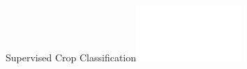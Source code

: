 



{
	\begin{frame}[plain]
	
	\Huge\color{white}
			\vspace{7em}
			\hfill Supervised Crop Classification\includegraphics[width=4cm]{images/TUM-white}\hspace{3em}
		
			
%			
			
	
	\vfill
\end{frame}
}

